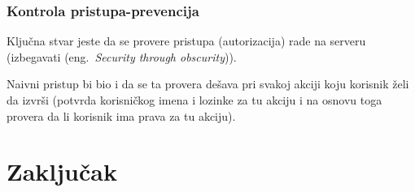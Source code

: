 \documentclass[a4paper]{article}
\begin{document}
\subsubsection{Kontrola pristupa-prevencija}
Klju\v{c}na stvar jeste da se provere pristupa (autorizacija) rade na serveru        (izbegavati (eng.~{\em Security through obscurity})). 

Naivni pristup bi bio i da se ta provera de\v{s}ava pri svakoj akciji koju korisnik \v{z}eli da izvr\v{s}i (potvrda korisni\v{c}kog imena i lozinke za tu akciju i na osnovu toga provera da li korisnik ima prava za tu akciju).
\section{Zaključak}

\appendix


\end{document}
